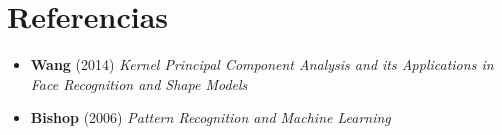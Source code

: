 \documentclass[11pt,]{article}
\begin{document}
\section{Referencias}\label{referencias}

\begin{itemize}
\item
  \textbf{Wang} (2014) \emph{Kernel Principal Component Analysis and its
  Applications in Face Recognition and Shape Models}
\item
  \textbf{Bishop} (2006) \emph{Pattern Recognition and Machine Learning}
\end{itemize}




\newpage
\singlespacing 
\end{document}
